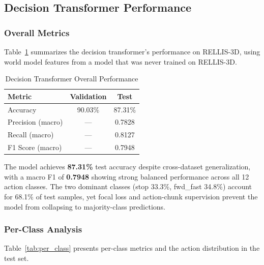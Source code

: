 \documentclass[sensors,article,submit,pdftex,moreauthors]{Definitions/mdpi}
\begin{document}
\subsection{Decision Transformer Performance}

\subsubsection{Overall Metrics}
Table~\ref{tab:overall_results} summarizes the decision transformer's performance on RELLIS-3D, using world model features from a model that was never trained on RELLIS-3D.

\begin{table}[h]
\caption{Decision Transformer Overall Performance}
\label{tab:overall_results}
\centering
\begin{tabular}{lcc}
\toprule
Metric & Validation & Test \\
\midrule
Accuracy & 90.03\% & 87.31\% \\
Precision (macro) & --- & 0.7828 \\
Recall (macro) & --- & 0.8127 \\
F1 Score (macro) & --- & 0.7948 \\
\bottomrule
\end{tabular}
\end{table}

The model achieves \textbf{87.31\%} test accuracy despite cross-dataset generalization, with a macro F1 of \textbf{0.7948} showing strong balanced performance across all 12 action classes. The two dominant classes (stop 33.3\%, fwd\_fast 34.8\%) account for 68.1\% of test samples, yet focal loss and action-chunk supervision prevent the model from collapsing to majority-class predictions.

\subsubsection{Per-Class Analysis}
Table~\ref{tab:per_class} presents per-class metrics and the action distribution in the test set.
\end{document}
